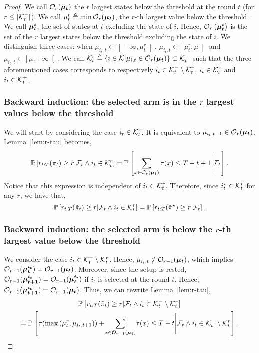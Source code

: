 \begin{proof}
We call $\mathcal{O}_r(\boldsymbol{\mu_t})$ the $r$ largest states below the threshold at the round $t$ (for $r\leq |\mathcal{K}_t^-|$). We call $\mu^r_{t} \triangleq \min {\mathcal{O}_r(\boldsymbol{\mu_t})}$, the $r$-th largest value below the threshold. We call $\boldsymbol{\mu_t}^{\boldsymbol{i}}$, the set of states at $t$ excluding the state of $i$. Hence, $\mathcal{O}_r\left(\boldsymbol{\mu_t}^{\boldsymbol{i}}\right)$ is the set of the $r$ largest states below the threshold excluding the state of $i$.   We  distinguish three cases: when $\mu_{i_t, t} \in \left] - \infty,  \mu^r_{t}\right[$, $ \mu_{i_t, t} \in \left[ \mu^r_{t}, \mu \right[$ and $\mu_{i_t, t} \in \left[ \mu, + \infty\right[$. We call $\mathcal{K}_t^r \triangleq \left\{i\in \mathcal{K} | \mu_{i,t} \in \mathcal{O}_r(\boldsymbol{\mu_t})\right\} \subset \mathcal{K}_t^-$ such that the three aforementioned cases corresponds to respectively $i_t\in \mathcal{K}_t^- \setminus \mathcal{K}_t^r$, $i_t\in \mathcal{K}_t^r$ and $i_t \in \mathcal{K}_t^+$.


\subsubsection{Backward induction: the selected arm is in the $r$ largest values below the threshold}
We will start by considering the case $i_t \in \mathcal{K}_t^r$. It is equivalent to $\mu_{i_t, t-1}\in \mathcal{O}_r(\boldsymbol{\mu_t})$. Lemma~\ref{lem:r-tau} becomes, 
\begin{equation*}
\mathbb{P}\left[r_{t:T}(\Tilde{\pi}_{t}) \geq r| \mathcal{F}_t \land i_t \in \mathcal{K}_t^r\right] = \mathbb{P}\left[ \sum_{x \in \mathcal{O}_r(\boldsymbol{\mu_t})} \tau(x) \leq T - t +1 \Bigg| \mathcal{F}_t\right].
\end{equation*}
Notice that this expression is independent of $i_t \in \mathcal{K}_t^r$. Therefore, since $i^\star_t \in \mathcal{K}_t^r$ for any $r$, we have that,
\begin{equation}
\mathbb{P}\left[r_{t:T}(\Tilde{\pi}_{t}) \geq r| \mathcal{F}_t \land i_t \in \mathcal{K}_t^r\right]  = \mathbb{P}\left[r_{t:T}(\Tilde{\pi}^\star) \geq r| \mathcal{F}_t \right].  \label{eq:muitt-middle}
\end{equation}

\subsubsection{Backward induction: the selected arm is below the $r$-th largest value below the threshold}
We consider the case $i_t \in \mathcal{K}_t^- \setminus \mathcal{K}_t^r$. Hence, $\mu_{i_t, t} \notin \mathcal{O}_{r-1}(\boldsymbol{\mu_t})$, which implies $\mathcal{O}_{r-1}(\boldsymbol{\mu_t}^{\boldsymbol{i_t}}) = \mathcal{O}_{r-1}(\boldsymbol{\mu_t})$.  Moreover, since the setup is rested, $\mathcal{O}_{r-1}(\boldsymbol{\mu}_{\boldsymbol{t+1}}^{\boldsymbol{i_t}}) = \mathcal{O}_{r-1}(\boldsymbol{\mu_t}^{\boldsymbol{i_t}})$ if $i_t$ is selected at the round $t$.  Hence, $\mathcal{O}_{r-1}(\boldsymbol{\mu}_{\boldsymbol{t+1}}^{\boldsymbol{i_t}}) =\mathcal{O}_{r-1}(\boldsymbol{\mu_t})$. Thus, we can rewrite Lemma~\ref{lem:r-tau}, 
\begin{multline}
     \mathbb{P}\left[r_{t:T}(\Tilde{\pi}_{t}) \geq r| \mathcal{F}_t \land i_t \in \mathcal{K}_t^- \setminus \mathcal{K}_t^r\right] \\
     = \mathbb{P}\left[\tau(\max\left(\mu^r_{t}, \mu_{i_t, t+1}\right)) +\!  \sum_{x \in \mathcal{O}_{r-1}(\boldsymbol{\mu_t})}\! \tau(x) \leq T - t \Bigg| \mathcal{F}_t \land i_t \in \mathcal{K}_t^- \setminus \mathcal{K}_t^r\right].\label{eq:suboptimal-f}
\end{multline}


\end{proof}
